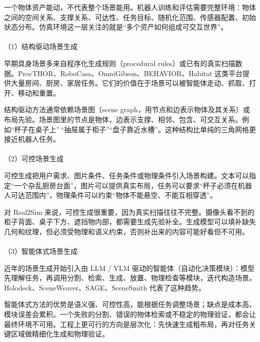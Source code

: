 \documentclass[
  chinese,
]{ctexart}
\makeatletter
\let\oldparagraph\paragraph
\renewcommand{\paragraph}{
    \@ifstar
      \xxxParagraphStar
      \xxxParagraphNoStar
  }
\newcommand{\xxxParagraphStar}[1]{\oldparagraph*{#1}\mbox{}}
\newcommand{\xxxParagraphNoStar}[1]{\oldparagraph{#1}\mbox{}}
\makeatother
\begin{document}
一个物体资产能动，不代表整个场景能用。机器人训练和评估需要完整环境：物体之间的空间关系、支撑关系、可达性、任务目标、随机化范围、传感器配置、初始状态分布。仿真环境这一层关注的就是``多个资产如何组成可交互世界''。

\paragraph{（1）结构驱动场景生成}\label{ux7ed3ux6784ux9a71ux52a8ux573aux666fux751fux6210}

早期具身场景多来自程序化生成规则（procedural
rules）或已有的真实扫描数据。ProcTHOR、RoboCasa、OmniGibson、BEHAVIOR、Habitat
这类平台提供大量房间、厨房、家居任务。它们的价值在于场景可以被智能体走动、抓取、打开、移动和重置。

结构驱动方法通常依赖场景图（scene
graph，用节点和边表示物体及其关系）或布局先验。场景图里的节点是物体，边表示支撑、相邻、包含、可交互关系。例如``杯子在桌子上''\,``抽屉属于柜子''``盘子靠近水槽''。这种结构比单纯的三角网格更接近机器人任务。

\paragraph{（2）可控场景生成}\label{ux53efux63a7ux573aux666fux751fux6210}

可控生成把用户需求、图片条件、任务条件或物理条件引入场景构建。文本可以指定``一个杂乱厨房台面''，图片可以提供真实布局，任务可以要求``杯子必须在机器人可达范围内''，物理条件可以约束``物体不能悬空、不能互相穿透''。

对 Real2Sim
来说，可控生成很重要，因为真实扫描往往不完整。摄像头看不到的柜子背面、桌子下方、遮挡物内部，都需要生成先验补全。生成模型可以填补缺失几何和纹理，但必须受物理和语义约束，否则补出来的内容可能好看但不可用。

\paragraph{（3）智能体式场景生成}\label{ux667aux80fdux4f53ux5f0fux573aux666fux751fux6210}

近年的场景生成开始引入由 LLM / VLM
驱动的智能体（自动化决策模块）：模型先理解任务，再调用分割、检索、生成、放置、物理检查等模块，迭代构造场景。Holodeck、SceneWeaver、SAGE、SceneSmith
代表了这种趋势。

智能体式方法的优势是语义强、可控性高，能根据任务调整场景；缺点是成本高、模块误差会累积。一个失败的分割、错误的物体检索或不稳定的物理验证，都会让最终环境不可用。工程上更可行的方向是层次化：先快速生成粗布局，再对任务关键区域做精细化生成和物理验证。
\end{document}
